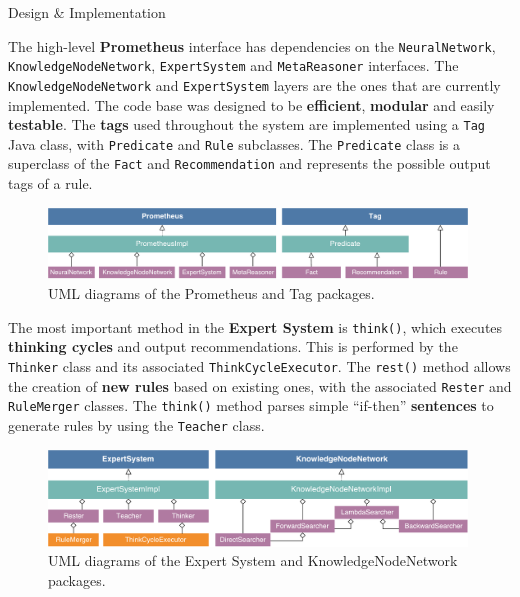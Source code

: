 \documentclass[final]{beamer} %
\newcommand{\code}[1]{\texttt{#1}}
\begin{document}
\begin{frame}
\begin{columns}
\begin{column}{.33\textwidth}
{				\begin{block}{Design \& Implementation}
					\parbox{0.99\textwidth}{
					The high-level \textbf{Prometheus} interface has dependencies on the \code{NeuralNetwork}, \code{KnowledgeNodeNetwork}, \code{ExpertSystem} and \code{MetaReasoner} interfaces. The \code{KnowledgeNodeNetwork} and \code{ExpertSystem} layers are the ones that are currently implemented. The code base was designed to be \textbf{efficient}, \textbf{modular} and easily \textbf{testable}. The \textbf{tags} used throughout the system are implemented using a \code{Tag} Java class, with \code{Predicate} and \code{Rule} subclasses. The \code{Predicate} class is a superclass of the \code{Fact} and \code{Recommendation} and represents the possible output tags of a rule.}
				
					\begin{figure}
						\centering
						\includegraphics[width=0.99\textwidth]{figures/uml_combined_1.pdf}
						\caption{UML diagrams of the Prometheus and Tag packages.}
					\end{figure}			
				
					\parbox{0.99\textwidth}{
					The most important method in the \textbf{Expert System} is \code{think()}, which executes \textbf{thinking cycles} and output recommendations. This is performed by the \code{Thinker} class and its associated \code{ThinkCycleExecutor}. The \code{rest()} method allows the creation of \textbf{new rules} based on existing ones, with the associated \code{Rester} and \code{RuleMerger} classes. The \code{think()} method parses simple ``if-then'' \textbf{sentences} to generate rules by using the \code{Teacher} class.}
				
					\begin{figure}
						\centering
						\includegraphics[width=0.99\textwidth]{figures/uml_combined_3.pdf}
						\caption{UML diagrams of the Expert System and KnowledgeNodeNetwork packages.}
					\end{figure}
				

\end{block}}
\end{column}
\end{columns}
\end{frame}
\end{document}
